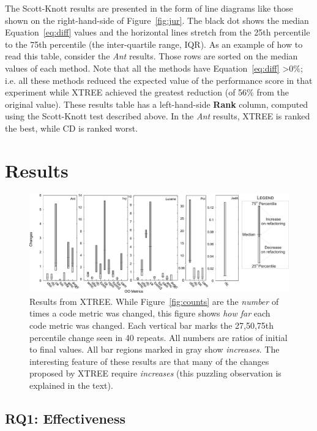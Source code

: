 \documentclass[twocolumn,5p]{elsarticle}
\newcommand{\fig}[1]{Figure~\ref{fig:#1}}
\newcommand{\eq}[1]{Equation~\ref{eq:#1}}
\theoremstyle{break}
\begin{document}
\begin{itemize}
The Scott-Knott  results are presented in the form of line diagrams like those shown on the right-hand-side of \fig{jur}.
The black dot shows the median \eq{diff} values and the horizontal lines stretch 
from the 25th percentile to the 75th percentile (the inter-quartile range, IQR).
As an example of how to read this table, consider the {\em Ant}
results. Those rows are  sorted on the median values of each method. Note that all the methods have \eq{diff} \textgreater $ 0\%$; i.e. all these methods reduced the expected value of the performance score in that experiment while XTREE achieved the greatest reduction (of 56\% from the original value).
These results table has a  left-hand-side  {\bf Rank} column, computed using the
Scott-Knott test described above. In the {\em Ant}
results, XTREE is ranked the best, while CD is  ranked   worst.


\section{Results}
 
 
\begin{figure}[!t]
\centering
\includegraphics[width=\linewidth]{figs/changes01.png}
\caption{Results  from XTREE.
While \fig{counts} are the {\em number} of times a code metric was changed,
this  figure shows {\em how far} each code metric was changed. Each vertical bar
marks the 27,50,75th percentile change seen in 40 repeats.
All numbers are ratios of initial to final values.
All bar regions marked in gray show {\em increases}.
The interesting feature of these results are that many
of the changes proposed by XTREE require {\em increases}
(this puzzling observation is explained in the text).}
\label{fig:changes}
\end{figure}



\subsection{RQ1: Effectiveness}


\end{itemize}
\end{document}
